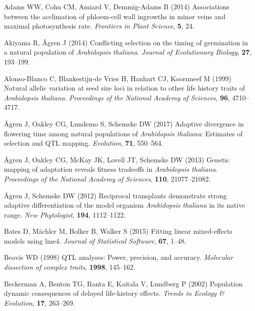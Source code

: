 \documentclass[]{article}
\begin{document}
\hypertarget{refs}{}
\leavevmode\hypertarget{ref-adams2014associations}{}%
Adams WW, Cohu CM, Amiard V, Demmig-Adams B (2014) Associations between the acclimation of phloem-cell wall ingrowths in minor veins and maximal photosynthesis rate. \emph{Frontiers in Plant Science}, \textbf{5}, 24.

\leavevmode\hypertarget{ref-akiyama2014conflicting}{}%
Akiyama R, Ågren J (2014) Conflicting selection on the timing of germination in a natural population of \emph{Arabidopsis thaliana}. \emph{Journal of Evolutionary Biology}, \textbf{27}, 193--199.

\leavevmode\hypertarget{ref-alonso1999natural}{}%
Alonso-Blanco C, Blankestijn-de Vries H, Hanhart CJ, Koornneef M (1999) Natural allelic variation at seed size loci in relation to other life history traits of \emph{Arabidopsis thaliana}. \emph{Proceedings of the National Academy of Sciences}, \textbf{96}, 4710--4717.

\leavevmode\hypertarget{ref-agren_flowering_time}{}%
Ågren J, Oakley CG, Lundemo S, Schemske DW (2017) Adaptive divergence in flowering time among natural populations of \emph{Arabidopsis thaliana}: Estimates of selection and QTL mapping. \emph{Evolution}, \textbf{71}, 550--564.

\leavevmode\hypertarget{ref-agren_genetic_2013}{}%
Ågren J, Oakley CG, McKay JK, Lovell JT, Schemske DW (2013) Genetic mapping of adaptation reveals fitness tradeoffs in \emph{Arabidopsis thaliana}. \emph{Proceedings of the National Academy of Sciences}, \textbf{110}, 21077--21082.

\leavevmode\hypertarget{ref-agren_reciprocal_2012}{}%
Ågren J, Schemske DW (2012) Reciprocal transplants demonstrate strong adaptive differentiation of the model organism \emph{Arabidopsis thaliana} in its native range. \emph{New Phytologist}, \textbf{194}, 1112--1122.

\leavevmode\hypertarget{ref-bates2015}{}%
Bates D, Mächler M, Bolker B, Walker S (2015) Fitting linear mixed-effects models using lme4. \emph{Journal of Statistical Software}, \textbf{67}, 1--48.

\leavevmode\hypertarget{ref-beavis1998qtl}{}%
Beavis WD (1998) QTL analyses: Power, precision, and accuracy. \emph{Molecular dissection of complex traits}, \textbf{1998}, 145--162.

\leavevmode\hypertarget{ref-beckerman2002population}{}%
Beckerman A, Benton TG, Ranta E, Kaitala V, Lundberg P (2002) Population dynamic consequences of delayed life-history effects. \emph{Trends in Ecology \& Evolution}, \textbf{17}, 263--269.
\end{document}
